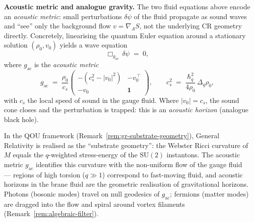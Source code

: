 \begin{remark}
\medskip
\noindent\textbf{Acoustic metric and analogue gravity.}\;
The two fluid equations above encode an \emph{acoustic metric}: small
perturbations $\delta\psi$ of the fluid propagate as sound waves and
``see'' only the background flow $v = \nabla_{\!A} S$, not the
underlying CR geometry directly.  Concretely, linearising the quantum
Euler equation around a stationary solution $(\rho_0, v_0)$ yields a
wave equation
\[
  \Box_{g_{\mathrm{ac}}}\,\delta\psi \;=\; 0,
\]
where $g_{\mathrm{ac}}$ is the \emph{acoustic metric}
\[
  g_{\mathrm{ac}}
  \;=\; \frac{\rho_0}{c_s}
  \begin{pmatrix}
    -(c_s^2 - \lvert v_0\rvert^2) & -v_0^{\,\top} \\
    -v_0 & \mathbf{1}
  \end{pmatrix},
  \qquad
  c_s^2 \;=\; \frac{\hbar_q^2}{4\rho_0}\,
              \Delta_q\rho_0,
\]
with $c_s$ the local speed of sound in the gauge fluid.  Where
$\lvert v_0\rvert = c_s$, the sound cone closes and the perturbation is
trapped: this is an \emph{acoustic horizon} (analogue black hole).

In the QOU framework (Remark~\ref{rem:gr-substrate-geometry}), General
Relativity is realised as the ``substrate geometry'': the Webster Ricci
curvature of $M$ equals the $q$-weighted stress-energy of the
$\mathrm{SU}(2)$ instantons.  The acoustic metric $g_{\mathrm{ac}}$
identifies this curvature with the non-uniform flow of the gauge fluid
--- regions of high torsion ($q \gg 1$) correspond to fast-moving
fluid, and acoustic horizons in the brane fluid are the geometric
realisation of gravitational horizons.  Photons (bosonic modes) travel
on null geodesics of $g_{\mathrm{ac}}$; fermions (matter modes) are
dragged into the flow and spiral around vortex filaments
(Remark~\ref{rem:algebraic-filter}).


\end{remark}
